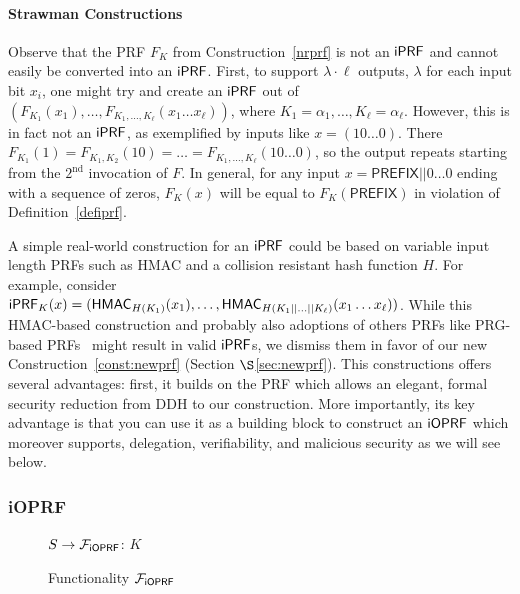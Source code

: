 \paragraph{Strawman Constructions}
Observe that the \citeauthor{prf} PRF $F_K$ from
Construction~\ref{nrprf} is not an $\mathsf{i}\mathsf{PRF}$ and cannot easily be
converted into an $\mathsf{i}\mathsf{PRF}$. First, to support $\lambda\cdot\ell$
outputs, $\lambda$ for each input bit $x_i$, one might try and create
an $\mathsf{i}\mathsf{PRF}$ out of
$(F_{K_1}(x_1),\ldots,F_{K_1,\ldots,K_\ell}(x_1\ldots{}x_\ell))$,
where $K_1=\alpha_1,\ldots,K_\ell=\alpha_\ell$.  However, this is in
fact not an $\mathsf{i}\mathsf{PRF}$, as exemplified by inputs like
$x=(10\ldots{}0)$. There
$F_{K_1}(1)=F_{K_1,K_2}(10)=\ldots=F_{K_1,\ldots,K_\ell}(10\ldots{}0)$,
so the output repeats starting from the $2^\text{nd}$ invocation of
$F$. In general, for any input $x=\mathsf{PREFIX}||0\ldots{}0$ ending
with a sequence of zeros, $F_K(x)$ will be equal to
$F_K(\mathsf{PREFIX})$ in violation of Definition~\ref{defiprf}.

A simple real-world construction for an $\mathsf{i}\mathsf{PRF}$ could be based on
variable input length PRFs such as HMAC and a collision resistant hash
function $H$. For example, consider
$\mathsf{i}\mathsf{PRF}_K(x)=(\mathsf{HMAC}_{H(K_1)}(x_1),\ldots,\mathsf{HMAC}_{H(K_1||\ldots||K_\ell)}(x_1\ldots{}x_\ell))$.
While this HMAC-based construction and probably also adoptions of
others PRFs like PRG-based PRFs~\cite{ggm} might result in valid
$\mathsf{i}\mathsf{PRF}$s, we dismiss them in favor of our new
Construction~\ref{const:newprf} (Section $\S$\ref{sec:newprf}). This
constructions offers several advantages: first, it builds on the
\citeauthor{prf} PRF which allows an elegant, formal security
reduction from DDH to our construction. More importantly, its key
advantage is that you can use it as a building block to construct an
$\mathsf{i}\mathsf{OPRF}$ which moreover supports, delegation, verifiability, and
malicious security as we will see below.

\subsubsection{iOPRF}
\begin{figure}[tb]
\LinesNumbered
\begingroup
\removelatexerror%
\begin{functionality}[H]
  $S\rightarrow{}\mathcal{F}_{\mathsf{i}\mathsf{OPRF}}$: $K$\; 
\end{functionality}
\endgroup
\caption{Functionality $\mathcal{F}_{\mathsf{i}\mathsf{OPRF}}$\label{idealioprf}}
\end{figure}

